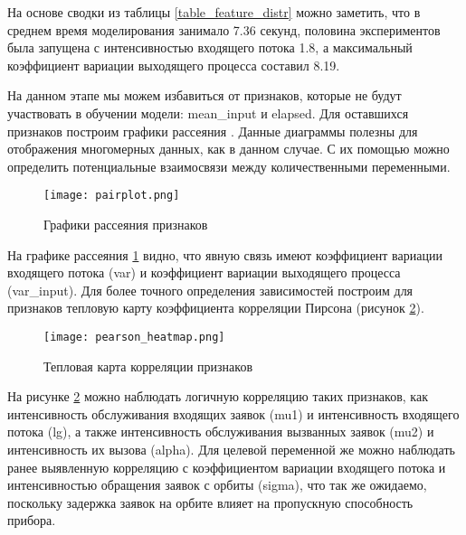 На основе сводки из таблицы \ref{table_feature_distr} можно заметить, что в среднем время моделирования занимало 7.36 секунд, половина экспериментов была запущена с интенсивностью входящего потока 1.8, а максимальный коэффициент вариации выходящего процесса составил 8.19.



На данном этапе мы можем избавиться от признаков, которые не будут участвовать в обучении модели: mean\_input и elapsed. Для оставшихся признаков построим графики рассеяния \cite{cox2007pairplot}. Данные диаграммы полезны для отображения многомерных данных, как в данном случае. С их помощью можно определить потенциальные взаимосвязи между количественными переменными.
\begin{figure}[H]
	\centering
	\texttt{[image: pairplot.png]}
	\caption{Графики рассеяния признаков}
	\label{pairplot}
\end{figure}
\clearpage
На графике рассеяния \ref{pairplot} видно, что явную связь имеют коэффициент вариации входящего потока (var) и коэффициент вариации выходящего процесса (var\_input). Для более точного определения зависимостей построим для признаков тепловую карту коэффициента корреляции Пирсона (рисунок \ref{pearson_heatmap}).
\begin{figure}[H]
	\centering
	\texttt{[image: pearson\_heatmap.png]}
	\caption{Тепловая карта корреляции признаков}
	\label{pearson_heatmap}
\end{figure}
На рисунке \ref{pearson_heatmap} можно наблюдать логичную корреляцию таких признаков, как интенсивность обслуживания входящих заявок (mu1) и интенсивность входящего потока (lg), а также интенсивность обслуживания вызванных заявок (mu2) и интенсивность их вызова (alpha). Для целевой переменной же можно наблюдать ранее выявленную корреляцию с коэффициентом вариации входящего потока и интенсивностью обращения заявок с орбиты (sigma), что так же ожидаемо, поскольку задержка заявок на орбите влияет на пропускную способность прибора.

